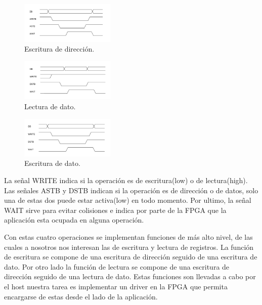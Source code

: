 \documentclass[11pt,letterpaper,spanish]{article}
\begin{document}
	\begin{figure}[h!]
	\begin{center}
	\includegraphics[width=0.4\textwidth]{figuras/address_write.png} 
	\caption{\label{address_write} Escritura de dirección.}
	\end{center}
	\end{figure}


	\begin{figure}[h!]
	\begin{center}
	\includegraphics[width=0.4\textwidth]{figuras/data_read.png} 
	\caption{\label{data_read} Lectura de dato.}
	\end{center}
	\end{figure}

	\begin{figure}[h!]
	\begin{center}
	\includegraphics[width=0.4\textwidth]{figuras/data_write.png} 
	\caption{\label{data_write} Escritura de dato.}
	\end{center}
	\end{figure}

\hfill \break

La señal WRITE indica si la operación es de escritura(low) o de lectura(high). Las señales ASTB y DSTB indican si la operación es de dirección o de datos, solo una de estas dos puede estar activa(low) en todo momento. Por ultimo, la señal WAIT sirve para evitar colisiones e indica por parte de la FPGA que la aplicación esta ocupada en alguna operación.

 Con estas cuatro operaciones se implementan funciones de más alto nivel, de las cuales a nosotros nos interesan las de escritura y lectura de registros. La función de escritura se compone de una escritura de dirección seguido de una escritura de dato. Por otro lado la función de lectura se compone de una escritura de dirección seguido de una lectura de dato. Estas funciones son llevadas a cabo por el host nuestra tarea es implementar un driver en la FPGA que permita encargarse de estas desde el lado de la aplicación.
 
\end{document}
